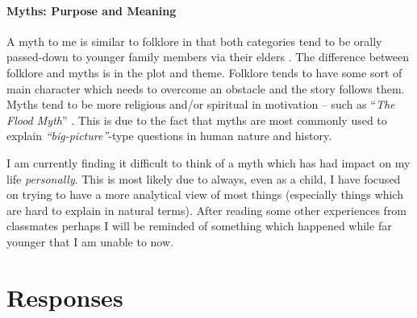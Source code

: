 \documentclass[12pt]{article}
\theoremstyle{definition}
\theoremstyle{plain}
\begin{document}
      \subsection{Myths: Purpose and Meaning}
        A myth to me is similar to folklore in that both categories tend to be
          orally passed-down to younger family members via their elders
          \autocite[p.~xiii]{textbook}. The difference between folklore and
          myths is in the plot and theme. Folklore tends to have some sort of
          main character which needs to overcome an obstacle and the story
          follows them. Myths tend to be more religious and/or spiritual in
          motivation -- such as ``\textit{The Flood Myth}''
          \autocite[p.~xiv]{textbook}. This is due to the fact that myths are
          most commonly used to explain \textit{``big-picture''}-type
          questions in human nature and history.

        I am currently finding it difficult to think of a myth which has had
          impact on my life \textit{personally}. This is most likely due to
          always, even as a child, I have focused on trying to have a more
          analytical view of most things (especially things which are hard
          to explain in natural terms). After reading some other experiences
          from classmates perhaps I will be reminded of something which happened
          while far younger that I am unable to now.


  \newpage
  \part{Responses}
\end{document}
